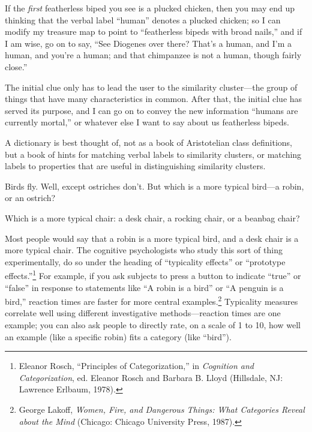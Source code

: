 {
 If the \textit{first} featherless biped you see is a plucked
chicken, then you may end up thinking that the verbal label
``human'' denotes a plucked chicken;
so I can modify my treasure map to point to
``featherless bipeds with broad
nails,'' and if I am wise, go on to say,
``See Diogenes over there? That's a
human, and I'm a human, and you're a
human; and that chimpanzee is not a human, though fairly
close.''}

{
 The initial clue only has to lead the user to the similarity
cluster---the group of things that have many characteristics in common.
After that, the initial clue has served its purpose, and I can go on to
convey the new information ``humans are currently
mortal,'' or whatever else I want to say about us
featherless bipeds.}

{
 A dictionary is best thought of, not as a book of Aristotelian
class definitions, but a book of hints for matching verbal labels to
similarity clusters, or matching labels to properties that are useful
in distinguishing similarity clusters.}

\myendsectiontext


{
 Birds fly. Well, except ostriches don't. But which
is a more typical bird---a robin, or an ostrich? }

{
 Which is a more typical chair: a desk chair, a rocking chair, or a
beanbag chair?}

{
 Most people would say that a robin is a more typical bird, and a
desk chair is a more typical chair. The cognitive psychologists who
study this sort of thing experimentally, do so under the heading of
``typicality effects'' or
``prototype
effects.''\footnote{Eleanor Rosch, ``Principles of
Categorization,'' in \textit{Cognition and
Categorization}, ed. Eleanor Rosch and Barbara B. Lloyd (Hillsdale, NJ:
Lawrence Erlbaum, 1978).} For example, if you ask
subjects to press a button to indicate
``true'' or
``false'' in response to statements
like ``A robin is a bird'' or
``A penguin is a bird,'' reaction
times are faster for more central examples.\footnote{George Lakoff, \textit{Women, Fire, and Dangerous Things: What
Categories Reveal about the Mind} (Chicago: Chicago University Press,
1987).}
Typicality measures correlate well using different investigative
methods---reaction times are one example; you can also ask people to
directly rate, on a scale of 1 to 10, how well an example (like a
specific robin) fits a category (like
``bird'').}

